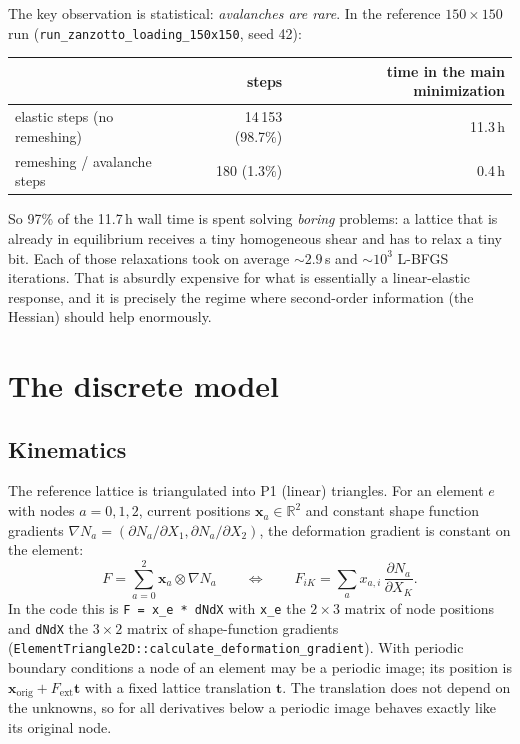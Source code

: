 \documentclass[11pt,a4paper]{article}
\theoremstyle{remark}
\newcommand{\R}{\mathbb{R}}
\newcommand{\x}{\bm{x}}
\newcommand{\code}[1]{\texttt{#1}}
\begin{document}
The key observation is statistical: \emph{avalanches are rare}. In the reference
$150\times150$ run (\code{run\_\allowbreak{}zanzotto\_\allowbreak{}loading\_\allowbreak{}150x150}, seed 42):

\begin{center}
\begin{tabular}{lrr}
\toprule
& steps & time in the main minimization \\
\midrule
elastic steps (no remeshing) & 14\,153 (98.7\%) & 11.3\,h \\
remeshing / avalanche steps  & 180 (1.3\%)     & 0.4\,h \\
\bottomrule
\end{tabular}
\end{center}

So 97\% of the 11.7\,h wall time is spent solving \emph{boring} problems: a lattice that
is already in equilibrium receives a tiny homogeneous shear and has to relax a tiny bit.
Each of those relaxations took on average $\sim2.9$\,s and $\sim10^3$ L-BFGS iterations.
That is absurdly expensive for what is essentially a linear-elastic response, and it is
precisely the regime where second-order information (the Hessian) should help
enormously.

\section{The discrete model}

\subsection{Kinematics}

The reference lattice is triangulated into P1 (linear) triangles. For an element $e$
with nodes $a=0,1,2$, current positions $\x_a\in\R^2$ and constant shape function
gradients $\nabla N_a = (\partial N_a/\partial X_1,\partial N_a/\partial X_2)$, the
deformation gradient is constant on the element:
\begin{equation}
F = \sum_{a=0}^{2} \x_a \otimes \nabla N_a
\qquad\Longleftrightarrow\qquad
F_{iK} = \sum_a x_{a,i}\,\frac{\partial N_a}{\partial X_K}.
\label{eq:F}
\end{equation}
In the code this is \code{F = x\_\allowbreak{}e * dNdX} with \code{x\_\allowbreak{}e} the $2\times3$ matrix of node
positions and \code{dNdX} the $3\times2$ matrix of shape-function gradients
(\code{ElementTriangle2D::\allowbreak{}calculate\_\allowbreak{}deformation\_\allowbreak{}gradient}). With periodic boundary
conditions a node of an element may be a periodic image; its position is
$\x_{\text{orig}} + F_{\mathrm{ext}}\bm{t}$ with a fixed lattice translation $\bm{t}$.
The translation does not depend on the unknowns, so for all derivatives below a periodic
image behaves exactly like its original node.
\end{document}
